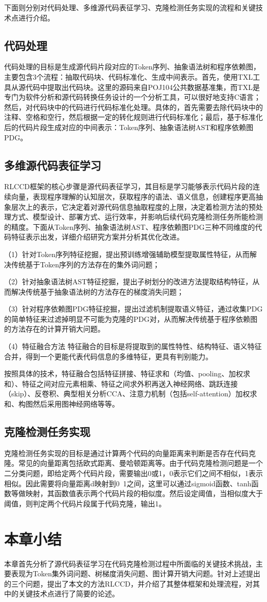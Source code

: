 下面则分别对代码处理、多维源代码表征学习、克隆检测任务实现的流程和关键技术点进行介绍。

\subsection{代码处理}
\label{subsec:Preprocess}
代码处理的目标是生成源代码片段对应的Token序列、抽象语法树和程序依赖图，主要包含3个流程：抽取代码块、代码标准化、生成中间表示。首先，使用TXL工具从源代码中提取出代码块。这里的源码来自POJ104公共数据基准集，而TXL是专门为软件分析和源代码转换任务设计的一个分析工具，可以很好地支持C语言；然后，对代码块中的代码进行代码标准化处理。具体的，首先需要去除代码块中的注释、空格和空行，然后根据一定的转化规则进行代码标准化；最后，基于标准化后的代码片段生成对应的中间表示：Token序列、抽象语法树AST和程序依赖图PDG。

\subsection{多维源代码表征学习}
\label{subsec:Representation}
RLCCD框架的核心步骤是源代码表征学习，其目标是学习能够表示代码片段的连续向量，表现程序理解的认知层次，获取程序的语法、语义信息，创建程序更高抽象层次上的表示，它决定着对源代码信息抽取程度的上限，决定着检测方法的预处理方式、模型设计、部署方式、运行效率，并影响后续代码克隆检测任务所能检测的精度。下面从Token序列、抽象语法树AST、程序依赖图PDG三种不同维度的代码特征表示出发，详细介绍研究方案并分析其优化改进。

（1）针对Token序列特征挖掘，提出预训练增强辅助模型提取属性特征，从而解决传统基于Token序列的方法存在的集外词问题；

（2）针对抽象语法树AST特征挖掘，提出子树划分的改进方法提取结构特征，从而解决传统基于抽象语法树的方法存在的梯度消失问题；

（3）针对程序依赖图PDG特征挖掘，提出过滤机制提取语义特征，通过收集PDG的简单特征来过滤掉明显不可能为克隆的PDG对，从而解决传统基于程序依赖图的方法存在的计算开销大问题。

（4）特征融合方法
特征融合的目标是将提取到的属性特性、结构特征、语义特征合并，得到一个更能代表代码信息的多维特征，更具有判别能力。

按照具体的技术，特征融合包括特征拼接、特征求和（均值、pooling、加权求和）、特征之间对应元素相乘、特征之间求外积再送入神经网络、跳跃连接（skip）、反卷积、典型相关分析CCA、注意力机制（包括self-attention）加权求和、构图然后采用图神经网络等等。

\subsection{克隆检测任务实现}
\label{subsec:Clone detection}
克隆检测任务实现的目标是通过计算两个代码的向量距离来判断是否存在代码克隆。常见的向量距离包括欧式距离、曼哈顿距离等。由于代码克隆检测问题是一个二分类问题，即给定两个代码片段，需要输出0或1，0表示它们之间不相似，1表示相似。因此需要将向量距离d映射到0~1之间，这里可以通过sigmoid函数、tanh函数等做映射，其函数值表示两个代码片段的相似度。然后设定阈值，当相似度大于阈值，则判定两个代码片段属于代码克隆，输出1。

\section{本章小结}
\label{sec:Summary2}
本章首先分析了源代码表征学习在代码克隆检测过程中所面临的关键技术挑战，主要表现为Token集外词问题、树梯度消失问题、图计算开销大问题。针对上述提出的三个问题，提出了本文的方法RLCCD，并介绍了其整体框架和处理流程，对其中的关键技术点进行了简要的论述。
